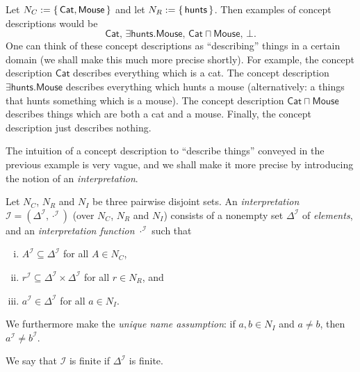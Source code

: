 \begin{Example}
  \label{expl:tom-and-jerry-1}
  Let $N_C := {\{\, \mathsf{Cat}, \mathsf{Mouse} \,\}}$ and let $N_R := {\{\, \mathsf{hunts}
  \,\}}$.  Then examples of \ELbot concept descriptions would be
  \begin{equation*}
    \mathsf{Cat}, \, \mathsf{\exists hunts. Mouse}, \, \mathsf{Cat \sqcap Mouse}, \, \bot.
  \end{equation*}
  One can think of these concept descriptions as ``describing'' things in a certain domain
  (we shall make this much more precise shortly).  For example, the concept description
  $\mathsf{Cat}$ describes everything which is a cat.  The concept description
  $\mathsf{\exists hunts. Mouse}$ describes everything which hunts a mouse (alternatively:
  a things that hunts something which is a mouse).  The concept description $\mathsf{Cat
    \sqcap Mouse}$ describes things which are both a cat and a mouse.  Finally, the
  concept description just describes nothing.
\end{Example}

The intuition of a concept description to ``describe things'' conveyed in the previous
example is very vague, and we shall make it more precise by introducing the notion of an
\emph{interpretation}.

\begin{Definition}[Interpretation]
  \label{def:interpretation}
  Let $N_C$, $N_R$ and $N_I$ be three pairwise disjoint sets.  An \emph{interpretation}
  $\mathcal{I} = (\Delta^{\mathcal{I}}, \cdot^{\mathcal{I}})$ (over $N_C$, $N_R$ and
  $N_I$) consists of a nonempty set $\Delta^{\mathcal{I}}$ of \emph{elements}, and an
  \emph{interpretation function} $\cdot^{\mathcal{I}}$ such that
  \begin{enumerate}[i. ]
  \item $A^{\mathcal{I}} \subseteq \Delta^{\mathcal{I}}$ for all $A \in N_C$,
  \item $r^{\mathcal{I}} \subseteq \Delta^{\mathcal{I}} \times \Delta^{\mathcal{I}}$ for
    all $r \in N_R$, and
  \item $a^{\mathcal{I}} \in \Delta^{\mathcal{I}}$ for all $a \in N_I$.
  \end{enumerate}
  We furthermore make the \emph{unique name assumption}: if $a, b \in N_I$ and $a \neq b$,
  then $a^{\mathcal{I}} \neq b^{\mathcal{I}}$.

  We say that $\mathcal{I}$ is finite if $\Delta^{\mathcal{I}}$ is finite.
\end{Definition}

